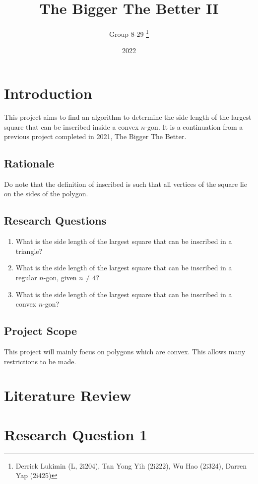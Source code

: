 \documentclass[12pt]{scrartcl}
\title{The Bigger The Better II}
\author{Group 8-29 \thanks{Derrick Lukimin (L, 2i204), Tan Yong Yih (2i222), Wu Hao (2i324), Darren Yap (2i425)}}
\date{2022}
\begin{document}
\onehalfspacing
\maketitle
\tableofcontents

\section{Introduction}
This project aims to find an algorithm to determine
the side length of the largest square that can be
inscribed inside a convex $n$-gon. It is a continuation from
a previous project completed in 2021, The Bigger The Better. \cite{tbtb1}

\subsection{Rationale}
Do note that the definition of inscribed is such that all vertices of the square lie on the sides of the polygon.

\subsection{Research Questions}
\begin{enumerate}
	\item What is the side length of the largest square that can be inscribed in a triangle?
	\item What is the side length of the largest square that can be inscribed in a regular $n$-gon, given $n \neq 4$?
	\item What is the side length of the largest square that can be inscribed in a convex $n$-gon?
\end{enumerate}

\subsection{Project Scope}
This project will mainly focus on polygons which are convex. This allows many restrictions to be made.

\section{Literature Review}

\section{Research Question 1}
\end{document}
